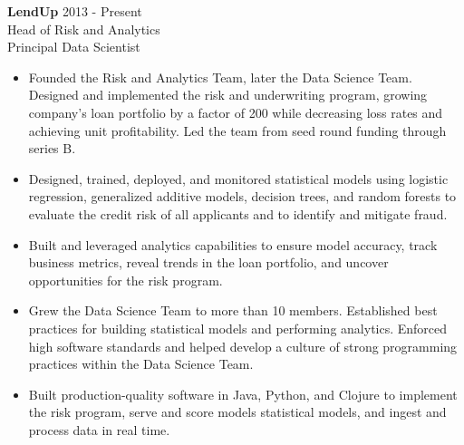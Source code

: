 \documentclass[9pt]{article}
\newenvironment{changemargin}[2]{%
  \begin{list}{}{%
    \setlength{\topsep}{0pt}%
    \setlength{\leftmargin}{#1}%
    \setlength{\rightmargin}{#2}%
    \setlength{\listparindent}{\parindent}%
    \setlength{\itemindent}{\parindent}%
    \setlength{\parsep}{\parskip}%
  }%
  \item[]}{\end{list}
}
\newenvironment{body} {
  \vspace*{-16pt}
\begin{changemargin}{-0.25in}{-0.5in}
  }
{\end{changemargin}
}
\begin{document}
\begin{body}

  \vspace{14pt}

  \textbf{LendUp} \hfill 2013 - Present \\
  Head of Risk and Analytics \\
  Principal Data Scientist

  \begin{itemize}


    \item Founded the Risk and Analytics Team, later the Data Science Team.  Designed and implemented the risk and underwriting program, growing company's loan portfolio by a factor of 200 while decreasing loss rates and achieving unit profitability.  Led the team from seed round funding through series B. \\

    \item Designed, trained, deployed, and monitored statistical models using logistic regression, generalized additive models, decision trees, and random forests to evaluate the credit risk of all applicants and to identify and mitigate fraud. \\

    \item Built and leveraged analytics capabilities to ensure model accuracy, track business metrics, reveal trends in the loan portfolio, and uncover opportunities for the risk program. %

    \item Grew the Data Science Team to more than 10 members. Established best practices for building statistical models and performing analytics.  Enforced high software standards and helped develop a culture of strong programming practices within the Data Science Team. \\

    \item Built production-quality software in Java, Python, and Clojure to implement the risk program, serve and score models statistical models, and ingest and process data in real time. \\


\end{itemize}
\end{body}
\end{document}
